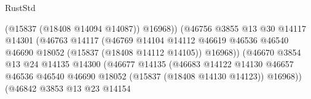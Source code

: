 \begin{lexlean}{RustStd}
\begin{coremodule}
                                                    (@15837 (@18408 @14094 @14087))
                                                    @16968))
                                                (@46756
                                                  @3855
                                                  @13
                                                  @30
                                                  @14117
                                                  @14301
                                                  (@46763
                                                    @14117
                                                    (@46769
                                                      @14104
                                                      @14112
                                                      @46619
                                                      @46536
                                                      @46540
                                                      @46690
                                                      @18052
                                                      (@15837 (@18408 @14112 @14105))
                                                      @16968))
                                                  (@46670
                                                    @3854
                                                    @13
                                                    @24
                                                    @14135
                                                    @14300
                                                    (@46677
                                                      @14135
                                                      (@46683
                                                        @14122
                                                        @14130
                                                        @46657
                                                        @46536
                                                        @46540
                                                        @46690
                                                        @18052
                                                        (@15837 (@18408 @14130 @14123))
                                                        @16968))
                                                    (@46842
                                                      @3853
                                                      @13
                                                      @23
                                                      @14154

\end{coremodule}
\end{lexlean}
